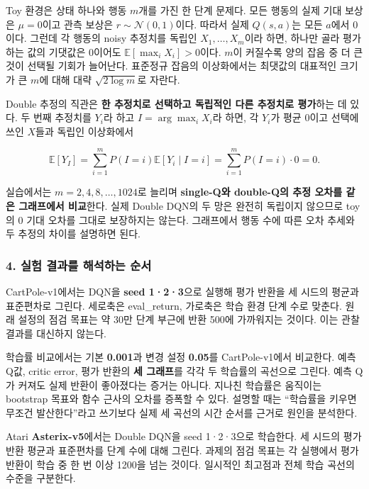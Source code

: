 \documentclass[11pt,a4paper]{article}
\begin{document}
Toy 환경은 상태 하나와 행동 $m$개를 가진 한 단계 문제다. 모든 행동의 실제 기대 보상은 $\mu=0$이고 관측 보상은 $r\sim\mathcal N(0,1)$이다. 따라서 실제 $Q(s,a)$는 모든 $a$에서 0이다. 그런데 각 행동의 noisy 추정치를 독립인 $X_1,\ldots,X_m$이라 하면, 하나만 골라 평가하는 값의 기댓값은 0이어도 $\mathbb E[\max_i X_i]>0$이다. $m$이 커질수록 양의 잡음 중 더 큰 것이 선택될 기회가 늘어난다. 표준정규 잡음의 이상화에서는 최댓값의 대표적인 크기가 큰 $m$에 대해 대략 $\sqrt{2\log m}$로 자란다.\par

Double 추정의 직관은 \textbf{한 추정치로 선택하고 독립적인 다른 추정치로 평가}하는 데 있다. 두 번째 추정치를 $Y_i$라 하고 $I=\arg\max_iX_i$라 하면, 각 $Y_i$가 평균 0이고 선택에 쓰인 $X$들과 독립인 이상화에서\par

\[
\mathbb E[Y_I]
=\sum_{i=1}^{m}P(I=i)\mathbb E[Y_i\mid I=i]
=\sum_{i=1}^{m}P(I=i)\cdot0=0.
\]

실습에서는 $m=2,4,8,\ldots,1024$로 늘리며 \textbf{single-Q와 double-Q의 추정 오차를 같은 그래프에서 비교}한다. 실제 Double DQN의 두 망은 완전히 독립이지 않으므로 toy의 0 기대 오차를 그대로 보장하지는 않는다. 그래프에서 행동 수에 따른 오차 추세와 두 추정의 차이를 설명하면 된다.\par

\subsubsection{4. 실험 결과를 해석하는 순서}

CartPole-v1에서는 DQN을 \textbf{seed 1·2·3}으로 실행해 평가 반환을 세 시드의 평균과 표준편차로 그린다. 세로축은 eval\_return, 가로축은 학습 환경 단계 수로 맞춘다. 원래 설정의 점검 목표는 약 30만 단계 부근에 반환 500에 가까워지는 것이다. 이는 관찰 결과를 대신하지 않는다.\par

학습률 비교에서는 기본 \textbf{0.001}과 변경 설정 \textbf{0.05}를 CartPole-v1에서 비교한다. 예측 Q값, critic error, 평가 반환의 \textbf{세 그래프}를 각각 두 학습률의 곡선으로 그린다. 예측 Q가 커져도 실제 반환이 좋아졌다는 증거는 아니다. 지나친 학습률은 움직이는 bootstrap 목표와 함수 근사의 오차를 증폭할 수 있다. 설명할 때는 “학습률을 키우면 무조건 발산한다”라고 쓰기보다 실제 세 곡선의 시간 순서를 근거로 원인을 분석한다.\par

Atari \textbf{Asterix-v5}에서는 Double DQN을 seed 1·2·3으로 학습한다. 세 시드의 평가 반환 평균과 표준편차를 단계 수에 대해 그린다. 과제의 점검 목표는 각 실행에서 평가 반환이 학습 중 한 번 이상 1200을 넘는 것이다. 일시적인 최고점과 전체 학습 곡선의 수준을 구분한다.\par
\end{document}
